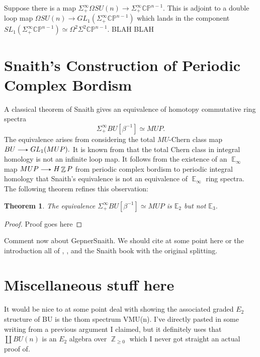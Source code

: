 \documentclass[11pt]{article}
\theoremstyle{definition}
\theoremstyle{plain}
\newtheorem{thm}[nul]{Theorem}
\numberwithin{equation}{nul}
\theoremstyle{TheoremNum}
\DeclareMathOperator{\Z}{\mathbb{Z}}
\DeclareMathOperator{\E}{\mathbb{E}}
\renewcommand{\to}{\ \tikz[baseline]\draw[>=stealth,->](0,0.5ex)--(0.5,0.5ex);\ }
\begin{document}
Suppose there is a map $\Sigma^{\infty}_+ \Omega SU(n) \rightarrow \Sigma^{\infty}_+ \mathbb{CP}^{n-1}$.  This is adjoint to a double loop map $\Omega SU(n) \rightarrow GL_1(\Sigma^{\infty}_+\mathbb{CP}^{n-1})$ which lands in the component $SL_1(\Sigma^{\infty}_+ \mathbb{CP}^{n-1}) \simeq \Omega^2 \Sigma^2 \mathbb{CP}^{n-1}$.  BLAH BLAH

\section{Snaith's Construction of Periodic Complex Bordism}

A classical theorem of Snaith \cite{SnaithOriginal} gives an equivalence of homotopy commutative ring spectra $$\Sigma^{\infty}_+ BU [\beta^{-1}] \simeq MUP.$$  The equivalence arises from considering the total $MU$-Chern class map $BU \to GL_1(MUP).$  It is known from \cite{SnaithNotMultiplicative} that the total Chern class in integral homology is not an infinite loop map.  It follows from the existence of an $\E_\infty$ map $MUP \to H\Z P$ from periodic complex bordism to periodic integral homology that Snaith's equivalence is not an equivalence of $\E_\infty$ ring spectra.  The following theorem refines this observation:



\begin{thm}
The equivalence $\Sigma^{\infty}_+ BU [\beta^{-1}] \simeq MUP$ is $\mathbb{E}_2$ but not $\mathbb{E}_3$.
\end{thm}

\begin{proof}
Proof goes here
\end{proof}

Comment now about GepnerSnaith.
We should cite at some point here or the introduction all of \cite{SnaithNotMultiplicative},  \cite{GepnerSnaith}, and the Snaith book with the original splitting.

\section{Miscellaneous stuff here}

It would be nice to at some point deal with showing the associated graded $E_2$ structure of BU is the thom spectrum VMU(n).  I've directly pasted in some writing from a previous argument I claimed, but it definitely uses that $\coprod BU(n)$ is an $E_2$ algebra over $\Z _{\geq 0}$ which I never got straight an actual proof of.  
\end{document}
